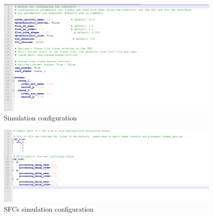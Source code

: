 \begin{figure}[h]
    \centering
    \includegraphics[width=1\textwidth]{simulation_config}
    \caption{Simulation configuration}
    \label{fig:simulation_config}
\end{figure}
\begin{figure}[h]
    \centering
    \includegraphics[width=1\textwidth]{SF_chaing}
    \caption{SFCs simulation configuration}
    \label{fig:SF_chaing}
\end{figure}
